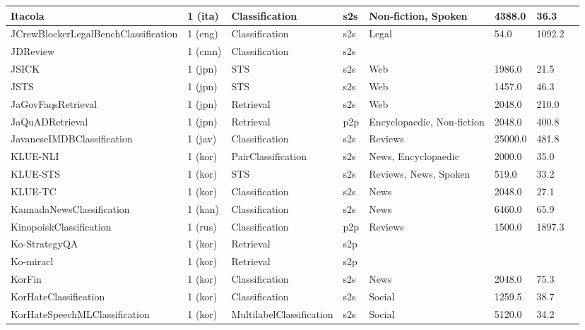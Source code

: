 \begin{longtable}{L{5.0cm}|L{1.5cm}L{1.4cm}L{1.4cm}L{1.4cm}L{1.4cm}L{1.0cm}L{1.0cm}}
 \hline 
Itacola \cite{trotta-etal-2021-monolingual-cross} & 1 (ita) & Classification & s2s & Non-fiction, Spoken & 4388.0 & 36.3 \\
 \hline 
JCrewBlockerLegalBenchClassification \cite{guha2023legalbench} & 1 (eng) & Classification & s2s & Legal & 54.0 & 1092.2 \\
 \hline 
JDReview \cite{nielsen-2023-scandeval} & 1 (cmn) & Classification & s2s &  &  &  \\
 \hline 
JSICK \cite{yanaka2022compositional} & 1 (jpn) & STS & s2s & Web & 1986.0 & 21.5 \\
 \hline 
JSTS \cite{kurihara-etal-2022-jglue} & 1 (jpn) & STS & s2s & Web & 1457.0 & 46.3 \\
 \hline 
JaGovFaqsRetrieval  & 1 (jpn) & Retrieval & s2s & Web & 2048.0 & 210.0 \\
 \hline 
JaQuADRetrieval \cite{so2022jaquad} & 1 (jpn) & Retrieval & p2p & Encyclopaedic, Non-fiction & 2048.0 & 400.8 \\
 \hline 
JavaneseIMDBClassification \cite{wongso2021causal} & 1 (jav) & Classification & s2s & Reviews & 25000.0 & 481.8 \\
 \hline 
KLUE-NLI \cite{park2021klue} & 1 (kor) & PairClassification & s2s & News, Encyclopaedic & 2000.0 & 35.0 \\
 \hline 
KLUE-STS \cite{park2021klue} & 1 (kor) & STS & s2s & Reviews, News, Spoken & 519.0 & 33.2 \\
 \hline 
KLUE-TC \cite{park2021klue} & 1 (kor) & Classification & s2s & News & 2048.0 & 27.1 \\
 \hline 
KannadaNewsClassification \cite{kunchukuttan2020indicnlpcorpus} & 1 (kan) & Classification & s2s & News & 6460.0 & 65.9 \\
 \hline 
KinopoiskClassification \cite{blinov2013research} & 1 (rus) & Classification & p2p & Reviews & 1500.0 & 1897.3 \\
 \hline 
Ko-StrategyQA \cite{geva2021strategyqa} & 1 (kor) & Retrieval & s2p &  &  &  \\
 \hline 
Ko-miracl \cite{10.1162/tacl_a_00595} & 1 (kor) & Retrieval & s2p &  &  &  \\
 \hline 
KorFin \cite{son2023removing} & 1 (kor) & Classification & s2s & News & 2048.0 & 75.3 \\
 \hline 
KorHateClassification \cite{moon2020beep} & 1 (kor) & Classification & s2s & Social & 1259.5 & 38.7 \\
 \hline 
KorHateSpeechMLClassification \cite{lee-etal-2022-k} & 1 (kor) & MultilabelClassification & s2s & Social & 5120.0 & 34.2 \\

\end{longtable}
